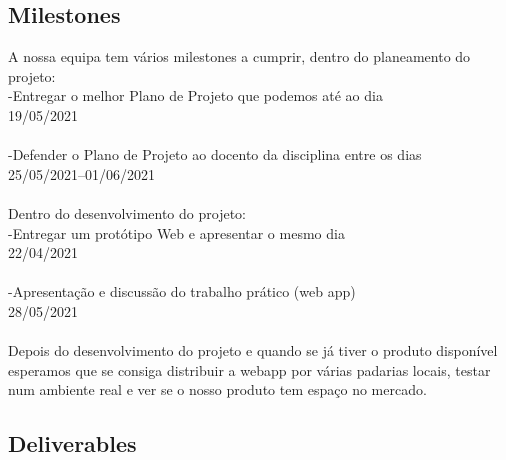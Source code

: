 \subsection{Milestones}
A nossa equipa tem vários milestones a cumprir, dentro do planeamento do projeto:
\\-Entregar o melhor Plano de Projeto que podemos até ao dia \\19/05/2021\\
\\-Defender o Plano de Projeto ao docento da disciplina entre os dias\\ 25/05/2021--01/06/2021\\
\\Dentro do desenvolvimento do projeto:
\\-Entregar um protótipo Web e apresentar o mesmo dia \\22/04/2021\\
\\-Apresentação e discussão do trabalho prático (web app) \\28/05/2021
\\\\Depois do desenvolvimento do projeto e quando se já tiver o produto disponível esperamos que se consiga distribuir a webapp por várias padarias locais, testar num ambiente real e ver se o nosso produto tem espaço no mercado.

\subsection{Deliverables}
